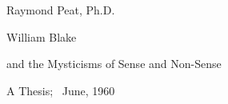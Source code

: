 \thispagestyle{empty}

{

    \raggedleft

    Raymond Peat, Ph.D.

    \bigskip
    \bigskip

    {

        \Huge%
        William Blake

        \large%
        and the Mysticisms of Sense and Non-Sense
    
    }

    \bigskip
    \bigskip

    A Thesis; \ June, 1960

}